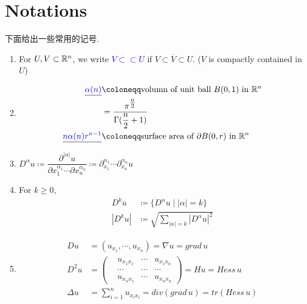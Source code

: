 \newpage

\section{Notations}
	下面给出一些常用的记号.
	\begin{enumerate}
		\item For $U , V \subset \mathbb{R}^n$, we write \underline{\textcolor{blue}{\textbf{$V \subset \subset U$}}} if $V \subset \overline{V} \subset U$. ($V$ is compactly contained in $U$)
		
		\vspace{2em}
		
		\item 
		\begin{align}
			\underline{\textcolor{blue}{\textbf{$\alpha(n)$}}} &\coloneqq \text{volumn of unit ball $B(0 , 1)$ in $\R^n$} \\
			&= \frac{\pi^{\tfrac{n}{2}}}{\Gamma(\dfrac{n}{2} + 1)} \\
			\underline{\textcolor{blue}{\textbf{$n \alpha(n) r^{n - 1}$}}} &\coloneqq \text{surface area of $\partial B(0 , r)$ in $\R^n$}
		\end{align}
	
		\vspace{2em}
		
		\item $D^{\alpha}u \coloneqq \dfrac{\partial^{\left| \alpha \right|} u}{\partial x_{1}^{\alpha_1} \cdots \partial x_{n}^{\alpha_n}} \coloneqq \partial_{x_{1}}^{\alpha_1} \cdots \partial_{x_n}^{\alpha_n} u$
		
		\vspace{2em}
		
		\item For $k \geq 0$, 
		\begin{align}
			D^k u &\coloneqq \{ D^{\alpha}u \mid \left| \alpha \right| = k \} \\
			\left| D^k u \right| &\coloneqq \sqrt{\sum_{\left| \alpha \right| = k} \left| D^{\alpha} u \right|^2}
		\end{align}
	
		\vspace{2em}
		
		\item 
		\begin{align}
			Du &= (u_{x_1} , \cdots , u_{x_n}) = \nabla u = grad \, u \\
			D^2 u &= 
			\begin{pmatrix}
				&u_{x_1 x_1} &\cdots &u_{x_1 x_n} \\
				&\cdots &\cdots &\cdots \\
				&u_{x_n x_1} &\cdots &u_{x_n x_n}
			\end{pmatrix}
			= H u = Hess \, u \\
			\Delta u &= \sum_{i = 1}^{n} u_{x_i x_i} = div(grad \, u) = tr(Hess \, u)
		\end{align}
	

\end{enumerate}
